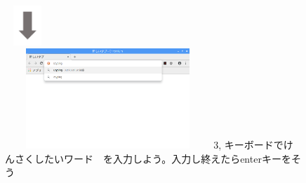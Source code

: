 \documentclass[a4paper,12pt]{jarticle}
\begin{document}
\begin{figure}[t]
  \hfill\begin{minipage}{7.78cm}
    {\centering
      \includegraphics[width=1.707cm,height=1.505cm]{textbook-img074.png}
    }\\
    \includegraphics[width=7.742cm,height=3.771cm]{textbook-img072.png}
    3,
    キーボードでけんさくしたいワード　を入力しよう。入力し終えたらenterキーをそう
  \end{minipage}

  \vspace{70mm}

\end{figure}
\clearpage
\end{document}
